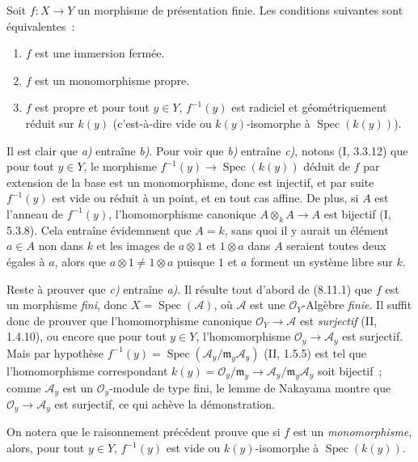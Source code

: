 \begin{proposition}[8.11.5]
\label{IV.8.11.5-fr}
Soit $f:X\to Y$ un morphisme de présentation finie. Les conditions suivantes
sont équivalentes~:
\begin{enumerate}
\item[\emph{a)}] $f$ est une immersion fermée.
\item[\emph{b)}] $f$ est un monomorphisme propre.
\item[\emph{c)}] $f$ est propre et pour tout $y\in Y$, $f^{-1}(y)$ est
radiciel et géométriquement réduit sur $k(y)$ (c'est-à-dire vide ou
$k(y)$-isomorphe à $\operatorname{Spec}(k(y))$).
\end{enumerate}
\end{proposition}

Il est clair que \emph{a)} entraîne \emph{b)}. Pour voir que \emph{b)}
entraîne \emph{c)}, notons (I, 3.3.12) que pour tout $y\in Y$, le morphisme
$f^{-1}(y)\to\operatorname{Spec}(k(y))$ déduit de $f$ par extension de la base
est un monomorphisme, donc est injectif, et par suite $f^{-1}(y)$ est vide ou
réduit à un point, et en tout cas affine. De plus, si $A$ est l'anneau de
$f^{-1}(y)$, l'homomorphisme canonique $A\otimes_kA\to A$ est bijectif
(I, 5.3.8). Cela entraîne évidemment que $A=k$, sans quoi il y aurait un
élément $a\in A$ non dans $k$ et les images de $a\otimes1$ et $1\otimes a$
dans $A$ seraient toutes deux égales à $a$, alors que $a\otimes1\neq1\otimes a$
puisque $1$ et $a$ forment un système libre sur $k$.

Reste à prouver que \emph{c)} entraîne \emph{a)}. Il résulte tout d'abord de
(8.11.1) que $f$ est un morphisme \emph{fini}, donc
$X=\operatorname{Spec}(\mathcal A)$, où $\mathcal A$ est une
$\mathcal O_Y$-Algèbre \emph{finie}. Il suffit donc de prouver que
l'homomorphisme canonique $\mathcal O_Y\to\mathcal A$ est \emph{surjectif}
(II, 1.4.10), ou encore que pour tout $y\in Y$, l'homomorphisme
$\mathcal O_y\to\mathcal A_y$ est surjectif. Mais par hypothèse
$f^{-1}(y)=\operatorname{Spec}(\mathcal A_y/\mathfrak m_y\mathcal A_y)$
(II, 1.5.5) est tel que l'homomorphisme correspondant
$k(y)=\mathcal O_y/\mathfrak m_y\to
\mathcal A_y/\mathfrak m_y\mathcal A_y$ soit bijectif~; comme $\mathcal A_y$
est un $\mathcal O_y$-module de type fini, le lemme de Nakayama montre que
$\mathcal O_y\to\mathcal A_y$ est surjectif, ce qui achève la démonstration.

\begin{remark}[8.11.5.1]
\label{IV.8.11.5.1-fr}
On notera que le raisonnement précédent prouve que si $f$ est un
\emph{monomorphisme}, alors, pour tout $y\in Y$, $f^{-1}(y)$ est vide ou
$k(y)$-isomorphe à $\operatorname{Spec}(k(y))$.
\end{remark}

